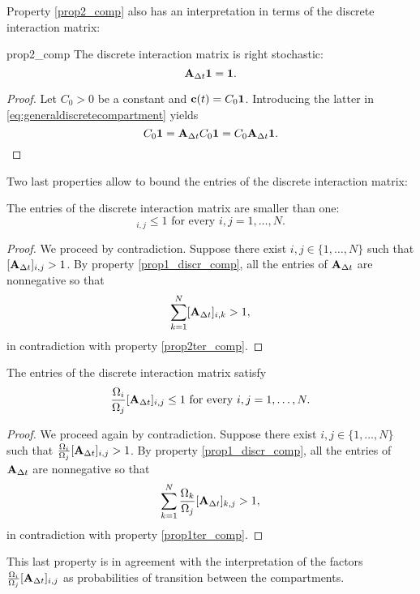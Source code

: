 Property \ref{prop2_comp} also has an interpretation in terms of the discrete interaction matrix:
\begin{propertyter}{prop2_comp} \label{prop2ter_comp} \label{prop3_discr_comp}
	The discrete interaction matrix is right stochastic:
	\begin{equation}
		\mathbf A_{\Delta t} \mathbf 1 = \mathbf 1.
	\end{equation}
\end{propertyter}
\begin{proof}
	Let $C_0 > 0$ be a constant and $\mathbf c(t) = C_0 \mathbf 1$. Introducing the latter in \eqref{eq:generaldiscretecompartment} yields
	\begin{equation}
		C_0 \mathbf 1 = \mathbf A_{\Delta t} C_0 \mathbf 1 = C_0 \mathbf A_{\Delta t} \mathbf 1.
	\end{equation}
\end{proof}
Two last properties allow to bound the entries of the discrete interaction matrix:
\begin{property} \label{prop4_discr_comp}
	The entries of the discrete interaction matrix are smaller than one:
	\begin{equation}
	 		[\b A_{\Delta t}]_{i,j} \le 1 \mbox{ for every } i,j = 1,\dots,N.
	\end{equation}
\end{property}
\begin{proof}
	We proceed by contradiction. Suppose there exist $i,j \in \{1,\dots,N\}$ such that $[\mathbf A_{\Delta t}]_{i,j} > 1$. By property \ref{prop1_discr_comp}, all the entries of $\mathbf A_{\Delta t}$ are nonnegative so that
	\begin{equation}
		\sum_{k = 1}^N [\mathbf A_{\Delta t}]_{i,k} > 1,
	\end{equation}
	in contradiction with property \ref{prop2ter_comp}.
\end{proof}
\begin{property} \label{prop5_discr_comp}
	The entries of the discrete interaction matrix satisfy
	\begin{equation}
		\frac{\Omega_i}{\Omega_j} [\mathbf A_{\Delta t}]_{i,j} \le 1 \mbox{ for every } i,j = 1,\dots,N.
	\end{equation}
\end{property}
\begin{proof}
	We proceed again by contradiction. Suppose there exist $i,j \in \{1,\dots,N\}$ such that $\frac{\Omega_i}{\Omega_j} [\mathbf A_{\Delta t}]_{i,j} > 1$. By property \ref{prop1_discr_comp}, all the entries of $\mathbf A_{\Delta t}$ are nonnegative so that
	\begin{equation}
		\sum_{k = 1}^N \frac{\Omega_k}{\Omega_j}[\mathbf A_{\Delta t}]_{k,j} > 1,
	\end{equation}
	in contradiction with property \ref{prop1ter_comp}.
\end{proof}
This last property is in agreement with the interpretation of the factors $\frac{\Omega_i}{\Omega_j} [\mathbf A_{\Delta t}]_{i,j}$ as probabilities of transition between the compartments.